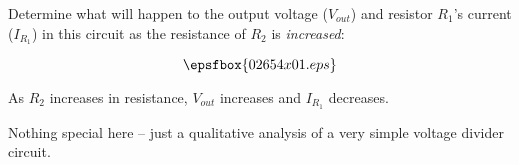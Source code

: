 

Determine what will happen to the output voltage ($V_{out}$) and resistor $R_1$'s current ($I_{R_1}$) in this circuit as the resistance of $R_2$ is {\it increased}:

$$\epsfbox{02654x01.eps}$$







As $R_2$ increases in resistance, $V_{out}$ increases and $I_{R_1}$ decreases.







Nothing special here -- just a qualitative analysis of a very simple voltage divider circuit.





